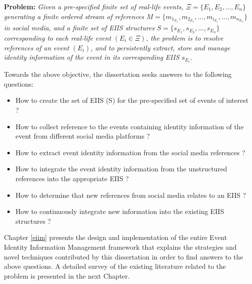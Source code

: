 \textbf{Problem:} \textit{Given a pre-specified finite set of real-life events, $\Xi = \{E_{1},E_{2}, ... ,E_{n}\}$ generating a finite ordered stream of references $M = \{m_{1_{E_{1}}}, m_{2_{E_{1}}}, ... ,m_{i_{E_{i}}}, ... ,m_{n_{E_{n}}}\}$ in social media, and a finite set of EIIS structures $S = \{s_{E_{1}},s_{E_{2}}, ... ,s_{E_{n}}\}$ corresponding to each real-life event $(E_{i} \in \Xi)$, the problem is to resolve references of an event $(E_{i})$, and to persistently extract, store and manage identity information of the event in its corresponding EIIS $s_{E_{i}}$}.

Towards the above objective, the dissertation seeks answers to the following questions:

\begin{itemize}
\item How to create the set of  EIIS (S) for the pre-specified set of events of interest ?
\item How to collect reference to the events containing identity information of the event from different social media platforms ?
\item How to extract event identity information from the social media references ?
\item How to integrate the event identity information from the unstructured references into the appropriate EIIS ? 
\item How to determine that new references from social media relates to an EIIS ?
\item How to continuously integrate new information into the existing EIIS structures ?


\end{itemize}

Chapter \ref{eiim} presents the design and implementation of the entire Event Identity Information Management framework that explains the strategies and novel techniques contributed by this dissertation in order to find answers to the above questions. A detailed survey of the existing literature related to the problem is presented in the next Chapter.




